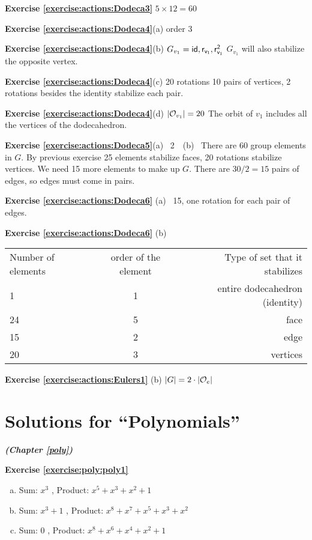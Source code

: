 \noindent\textbf{Exercise \ref{exercise:actions:Dodeca3}}
$5\times 12=60$

\noindent\textbf{Exercise \ref{exercise:actions:Dodeca4}}(a) 
order 3

\noindent\textbf{Exercise \ref{exercise:actions:Dodeca4}}(b) 
$G_{v_1}={\sf{id},r_{v_1},r_{v_1}^2}$ $G_{v_1}$ will also stabilize the opposite vertex.

\noindent\textbf{Exercise \ref{exercise:actions:Dodeca4}}(c) 
 20 rotations 10 pairs of vertices, 2 rotations besides the identity stabilize each pair.

\noindent\textbf{Exercise \ref{exercise:actions:Dodeca4}}(d) 
$|{\cal O}_{v_1}|=20$ The orbit of $v_1$ includes all the vertices of the dodecahedron.

\noindent\textbf{Exercise \ref{exercise:actions:Dodeca5}}(a) ~2~~(b)~
There are 60 group elements in $G$.  By previous exercise 25 elements stabilize faces, 20 rotations stabilize vertices. We need 15 more elements to make up $G$.  There are $30/2=15$ pairs of edges, so edges must come in pairs.

\noindent\textbf{Exercise \ref{exercise:actions:Dodeca6}} (a)~
 15, one rotation for each pair of edges.

\noindent\textbf{Exercise \ref{exercise:actions:Dodeca6}} (b)~

\begin{tabular}{ l c r }
Number of elements & order of the element & Type of set that it stabilizes \\
1 & 1 & entire dodecahedron (identity) \\
24 & 5 & face  \\
15 & 2 & edge \\
20 & 3  & vertices\\
\end{tabular}

\noindent\textbf{Exercise \ref{exercise:actions:Eulers1}} (b)
 $|G|=2\cdot |{\cal O}_e|$

\section{Solutions for ``Polynomials''}
\noindent\textbf{\textit{ (Chapter \ref{poly})}}\bigskip

\noindent\textbf{Exercise \ref{exercise:poly:poly1}}
\begin {enumerate} [(a)]
\item
 Sum: $x^3$ , Product: $x^5+x^3+x^2+1$
\item
 Sum: $x^3+1$ , Product: $x^8+x^7+x^5+x^3+x^2$
\item
 Sum: $0$ , Product: $x^8+x^6+x^4+x^2+1$
\end {enumerate}

